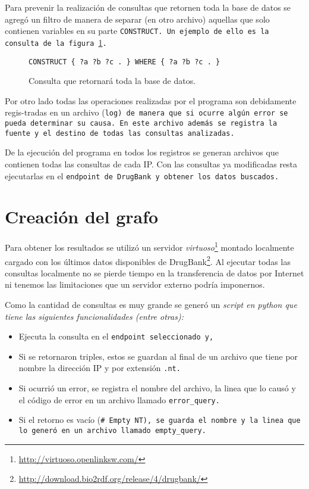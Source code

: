 Para prevenir la realización de consultas que retornen toda la base de datos se
agregó un filtro de manera de separar (en otro archivo) aquellas que solo
contienen variables en su parte \tt{CONSTRUCT}. Un ejemplo de ello es la
consulta de la figura~\ref{fig:exbigq}.

\begin{figure}[ht]
  \centering
  \tt{CONSTRUCT \{ ?a ?b ?c . \} WHERE \{ ?a ?b ?c . \}}
  \caption{Consulta que retornará toda la base de datos.}\label{fig:exbigq}
\end{figure}

Por otro lado todas las operaciones realizadas por el programa son debidamente
regis-tradas en un archivo (\tt{log}) de manera que si ocurre algún error se
pueda determinar su causa. En este archivo además se registra la fuente y el
destino de todas las consultas analizadas.

De la ejecución del programa en todos los registros se generan 
archivos que contienen todas las consultas de cada IP. Con las
consultas ya modificadas resta ejecutarlas en el \tt{endpoint} de DrugBank y
obtener los datos buscados.

\section{Creación del grafo}\label{d:cg}
Para obtener los resultados se utilizó un servidor
\emph{virtuoso}\footnote{\url{http://virtuoso.openlinksw.com/}} montado 
localmente cargado con los últimos datos disponibles de
DrugBank\footnote{\url{http://download.bio2rdf.org/release/4/drugbank/}}.
Al ejecutar todas las consultas localmente no se pierde tiempo en la
transferencia de datos por Internet ni tenemos las limitaciones que un servidor
externo podría imponernos. 

Como la cantidad de consultas es muy grande se generó un \it{script} en
\it{python} que tiene las siguientes funcionalidades (entre otras):
\begin{itemize}
  \item
    Ejecuta la consulta en el \tt{endpoint} seleccionado y,
  \item
    Si se retornaron triples, estos se guardan al final de un archivo que tiene
    por nombre la dirección IP y por extensión \tt{.nt}.
  \item
    Si ocurrió un error, se registra el nombre del archivo, la linea que lo
    causó y el código de error en un archivo llamado \tt{error\_query}.
  \item
    Si el retorno es vacío (\tt{\# Empty NT}), se guarda el nombre y la linea que
    lo generó en un archivo llamado \tt{empty\_query}.
\end{itemize}

